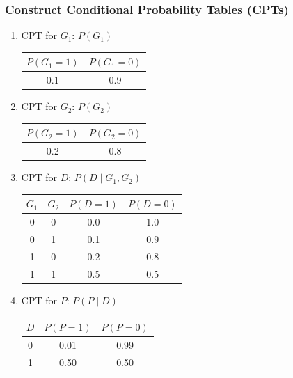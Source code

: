 \documentclass{article}
\begin{document}
\subsubsection*{Construct Conditional Probability Tables (CPTs)}
\begin{enumerate}
    \item CPT for $G_1$: $P(G_1)$
    \begin{center}
    \begin{tabular}{c c}
    \toprule
    $P(G_1=1)$ & $P(G_1=0)$ \\
    \midrule
    0.1 & 0.9 \\
    \bottomrule
    \end{tabular}
    \end{center}
    \item CPT for $G_2$: $P(G_2)$
    \begin{center}
    \begin{tabular}{c c}
    \toprule
    $P(G_2=1)$ & $P(G_2=0)$ \\
    \midrule
    0.2 & 0.8 \\
    \bottomrule
    \end{tabular}
    \end{center}
    \item CPT for $D$: $P(D \mid G_1, G_2)$
    \begin{center}
    \begin{tabular}{c c | c c}
    \toprule
    $G_1$ & $G_2$ & $P(D=1)$ & $P(D=0)$ \\
    \midrule
    0 & 0 & 0.0 & 1.0 \\
    0 & 1 & 0.1 & 0.9 \\
    1 & 0 & 0.2 & 0.8 \\
    1 & 1 & 0.5 & 0.5 \\
    \bottomrule
    \end{tabular}
    \end{center}
    \item CPT for $P$: $P(P \mid D)$
    \begin{center}
    \begin{tabular}{c | c c}
    \toprule
    $D$ & $P(P=1)$ & $P(P=0)$ \\
    \midrule
    0 & 0.01 & 0.99 \\
    1 & 0.50 & 0.50 \\
    \bottomrule
    \end{tabular}
    \end{center}
\end{enumerate}
\end{document}
